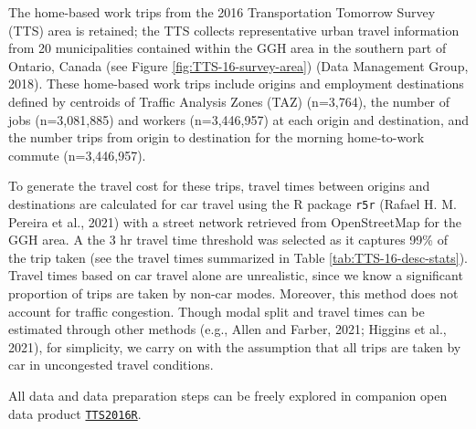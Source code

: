 \documentclass[]{elsarticle} %
\begin{document}
The home-based work trips from the 2016 Transportation Tomorrow Survey
(TTS) area is retained; the TTS collects representative urban travel
information from 20 municipalities contained within the GGH area in the
southern part of Ontario, Canada (see Figure
\ref{fig:TTS-16-survey-area}) (Data Management Group, 2018). These
home-based work trips include origins and employment destinations
defined by centroids of Traffic Analysis Zones (TAZ) (n=3,764), the
number of jobs (n=3,081,885) and workers (n=3,446,957) at each origin
and destination, and the number trips from origin to destination for the
morning home-to-work commute (n=3,446,957).

To generate the travel cost for these trips, travel times between
origins and destinations are calculated for car travel using the R
package \texttt{r5r} (Rafael H. M. Pereira et al., 2021) with a street
network retrieved from OpenStreetMap for the GGH area. A the 3 hr travel
time threshold was selected as it captures 99\% of the trip taken (see
the travel times summarized in Table \ref{tab:TTS-16-desc-stats}).
Travel times based on car travel alone are unrealistic, since we know a
significant proportion of trips are taken by non-car modes. Moreover,
this method does not account for traffic congestion. Though modal split
and travel times can be estimated through other methods (e.g., Allen and
Farber, 2021; Higgins et al., 2021), for simplicity, we carry on with
the assumption that all trips are taken by car in uncongested travel
conditions.

All data and data preparation steps can be freely explored in companion
open data product
\href{https://github.com/soukhova/TTS2016R}{\texttt{TTS2016R}}.
\end{document}
